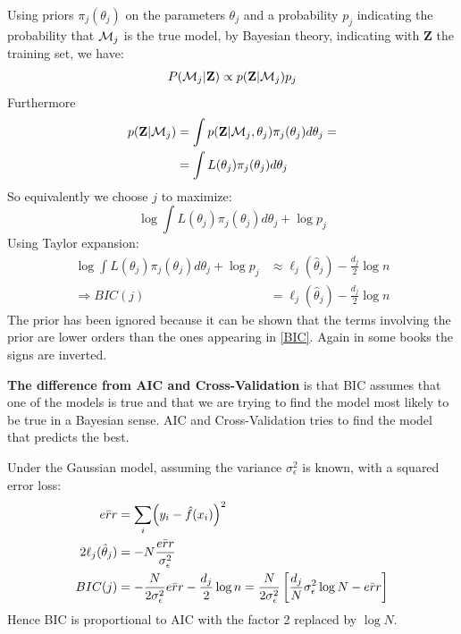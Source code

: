 \documentclass[12pt, letterpaper]{article}
\theoremstyle{definition}
\DeclarePairedDelimiter\autobracket{(}{)}
\newcommand{\br}[1]{\autobracket*{#1}}
\begin{document}
Using priors $\pi_j(\theta_j)$ on the parameters $\theta_j$ and a probability $p_j$ indicating the probability that  $\CMcal{M}_j$ is the true model, by Bayesian theory, indicating with $\mathbf{Z}$ the training set, we have:
\begin{equation}
P(\CMcal{M}_j|\mathbf{Z}) \propto p(\mathbf{Z}|\CMcal{M}_j) p_j
\end{equation}
Furthermore
\begin{equation}
\begin{aligned}
p(\mathbf{Z}|\CMcal{M}_j) &= \int p(\mathbf{Z}|\CMcal{M}_j,\theta_j)\pi_j(\theta_j) d\theta_j = \\
&=\int L(\theta_j)\pi_j(\theta_j) d\theta_j
\end{aligned}
\end{equation}
So equivalently we choose $j$ to maximize:
\begin{equation}
\log \int L(\theta_j)\pi_j(\theta_j) d\theta_j + \log p_j
\end{equation}
Using Taylor expansion:
\begin{equation}
\begin{aligned}
\log \int L(\theta_j)\pi_j(\theta_j) d\theta_j + \log p_j &\approx \ell_j(\hat{\theta}_j) - \frac{d_j}{2}\log n \\
\Rightarrow BIC(j) &= \ell_j(\hat{\theta}_j) - \frac{d_j}{2}\log n
\end{aligned}
\label{BIC}
\end{equation}
The prior has been ignored because it can be shown that the terms involving the prior are lower orders than the ones appearing in \ref{BIC}. Again in some books the signs are inverted.

\textbf{The difference from AIC and Cross-Validation} is that BIC assumes that one of the models is true and that we are trying to find the model most likely to be true in a Bayesian sense. AIC and Cross-Validation tries to find the model that predicts the best.

Under the Gaussian model, assuming the variance $\sigma_\epsilon^2$ is known, with a squared error loss:
\begin{equation}
\begin{aligned}
\bar{err} &=  \sum_i\br{y_i - \hat{f}(x_i)}^2\\
2 \ell_j(\hat{\theta}_j) &= -N\frac{\bar{err}}{\sigma_\epsilon^2}\\
BIC(j) &= -\frac{N}{2\sigma_\epsilon^2}\bar{err} - \frac{d_j}{2}\log n = \frac{N}{2\sigma_\epsilon^2} \left[ \frac{d_j}{N} \sigma_\epsilon^2 \log N - \bar{err} \right]
\end{aligned}
\end{equation}
Hence BIC is proportional to AIC with the factor 2 replaced by $\log N$.
\end{document}
